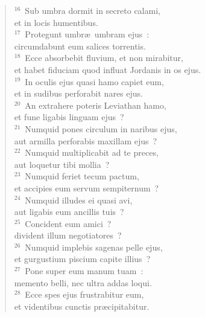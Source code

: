 \begin{flushleft}
\begin{verse}
${}^{16}$~Sub umbra dormit in secreto calami,\\ et in locis humentibus.\\
${}^{17}$~Protegunt umbr\ae\ umbram ejus~:\\ circumdabunt eum salices torrentis.\\
${}^{18}$~Ecce absorbebit fluvium, et non mirabitur,\\ et habet fiduciam quod influat Jordanis in os ejus.\\
${}^{19}$~In oculis ejus quasi hamo capiet eum,\\ et in sudibus perforabit nares ejus.\\
${}^{20}$~An extrahere poteris Leviathan hamo,\\ et fune ligabis linguam ejus~?\\
${}^{21}$~Numquid pones circulum in naribus ejus,\\ aut armilla perforabis maxillam ejus~?\\
${}^{22}$~Numquid multiplicabit ad te preces,\\ aut loquetur tibi mollia~?\\
${}^{23}$~Numquid feriet tecum pactum,\\ et accipies eum servum sempiternum~?\\
${}^{24}$~Numquid illudes ei quasi avi,\\ aut ligabis eum ancillis tuis~?\\
${}^{25}$~Concident eum amici~?\\ divident illum negotiatores~?\\
${}^{26}$~Numquid implebis sagenas pelle ejus,\\ et gurgustium piscium capite illius~?\\
${}^{27}$~Pone super eum manum tuam~:\\ memento belli, nec ultra addas loqui.\\
${}^{28}$~Ecce spes ejus frustrabitur eum,\\ et videntibus cunctis pr\ae cipitabitur.\end{verse}\end{flushleft}


